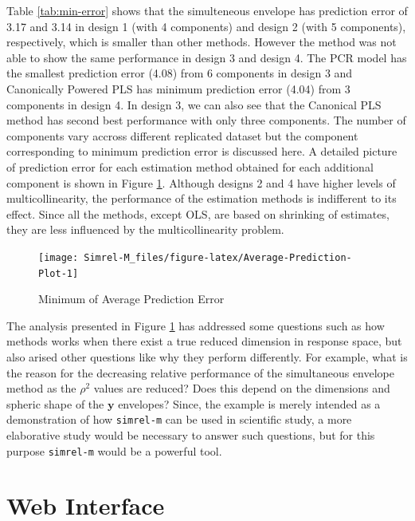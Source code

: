 \documentclass[num-refs]{wiley-article}
\begin{document}
Table \ref{tab:min-error} shows that the simulteneous envelope has
prediction error of 3.17 and 3.14 in design 1 (with 4 components) and
design 2 (with 5 components), respectively, which is smaller than other
methods. However the method was not able to show the same performance in
design 3 and design 4. The PCR model has the smallest prediction error
(4.08) from 6 components in design 3 and Canonically Powered PLS has
minimum prediction error (4.04) from 3 components in design 4. In design
3, we can also see that the Canonical PLS method has second best
performance with only three components. The number of components vary
accross different replicated dataset but the component corresponding to
minimum prediction error is discussed here. A detailed picture of
prediction error for each estimation method obtained for each additional
component is shown in Figure \ref{fig:Average-Prediction-Plot}. Although
designs 2 and 4 have higher levels of multicollinearity, the performance
of the estimation methods is indifferent to its effect. Since all the
methods, except OLS, are based on shrinking of estimates, they are less
influenced by the multicollinearity problem.

\begin{figure}[H]
\texttt{[image: Simrel-M\_files/figure-latex/Average-Prediction-Plot-1]} \caption{Minimum of Average Prediction Error}\label{fig:Average-Prediction-Plot}
\end{figure}

The analysis presented in Figure \ref{fig:Average-Prediction-Plot} has
addressed some questions such as how methods works when there exist a
true reduced dimension in response space, but also arised other
questions like why they perform differently. For example, what is the
reason for the decreasing relative performance of the simultaneous
envelope method as the \(\rho^2\) values are reduced? Does this depend
on the dimensions and spheric shape of the \(\mathbf{y}\) envelopes?
Since, the example is merely intended as a demonstration of how
\texttt{simrel-m} can be used in scientific study, a more elaborative
study would be necessary to answer such questions, but for this purpose
\texttt{simrel-m} would be a powerful tool.

\section{Web Interface}\label{web-interface}
\end{document}
